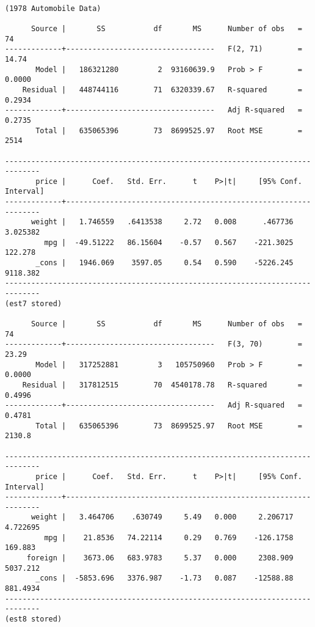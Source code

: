 \documentclass[10pt,parskip=half,
	toc=sectionentrywithdots,
	bibliography=totocnumbered,
	captions=tableheading,numbers=noendperiod]{scrartcl}
\begin{document}
\begin{lstlisting}[language={},postbreak={},numbers=none,xrightmargin=7pt,belowskip=5pt,aboveskip=5pt,breakindent=0pt]

(1978 Automobile Data)

      Source |       SS           df       MS      Number of obs   =        74
-------------+----------------------------------   F(2, 71)        =     14.74
       Model |   186321280         2  93160639.9   Prob > F        =    0.0000
    Residual |   448744116        71  6320339.67   R-squared       =    0.2934
-------------+----------------------------------   Adj R-squared   =    0.2735
       Total |   635065396        73  8699525.97   Root MSE        =      2514

------------------------------------------------------------------------------
       price |      Coef.   Std. Err.      t    P>|t|     [95% Conf. Interval]
-------------+----------------------------------------------------------------
      weight |   1.746559   .6413538     2.72   0.008      .467736    3.025382
         mpg |  -49.51222   86.15604    -0.57   0.567    -221.3025     122.278
       _cons |   1946.069    3597.05     0.54   0.590    -5226.245    9118.382
------------------------------------------------------------------------------
(est7 stored)

      Source |       SS           df       MS      Number of obs   =        74
-------------+----------------------------------   F(3, 70)        =     23.29
       Model |   317252881         3   105750960   Prob > F        =    0.0000
    Residual |   317812515        70  4540178.78   R-squared       =    0.4996
-------------+----------------------------------   Adj R-squared   =    0.4781
       Total |   635065396        73  8699525.97   Root MSE        =    2130.8

------------------------------------------------------------------------------
       price |      Coef.   Std. Err.      t    P>|t|     [95% Conf. Interval]
-------------+----------------------------------------------------------------
      weight |   3.464706    .630749     5.49   0.000     2.206717    4.722695
         mpg |    21.8536   74.22114     0.29   0.769    -126.1758     169.883
     foreign |    3673.06   683.9783     5.37   0.000     2308.909    5037.212
       _cons |  -5853.696   3376.987    -1.73   0.087    -12588.88    881.4934
------------------------------------------------------------------------------
(est8 stored)

\end{lstlisting}
\end{document}

